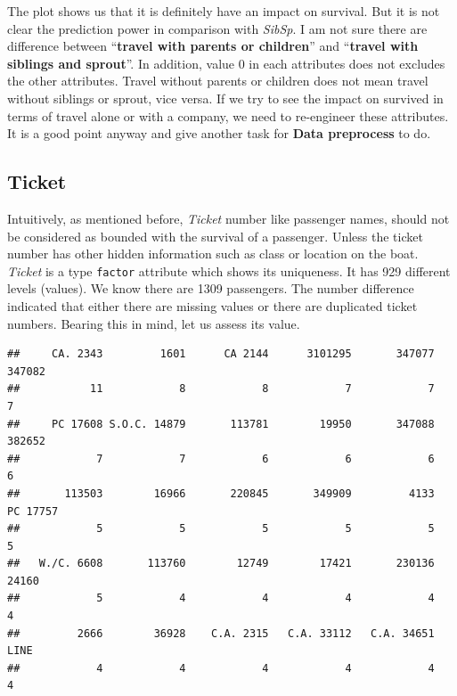\documentclass[
]{book}
\newenvironment{Shaded}{\begin{snugshade}}{\end{snugshade}}
\newcommand{\CommentTok}[1]{\textcolor[rgb]{0.56,0.35,0.01}{\textit{#1}}}
\newcommand{\DecValTok}[1]{\textcolor[rgb]{0.00,0.00,0.81}{#1}}
\newcommand{\KeywordTok}[1]{\textcolor[rgb]{0.13,0.29,0.53}{\textbf{#1}}}
\newcommand{\NormalTok}[1]{#1}
\newcommand{\OperatorTok}[1]{\textcolor[rgb]{0.81,0.36,0.00}{\textbf{#1}}}
\begin{document}
The plot shows us that it is definitely have an impact on survival. But it is not clear the prediction power in comparison with \emph{SibSp}. I am not sure there are difference between ``\textbf{travel with parents or children}'' and ``\textbf{travel with siblings and sprout}''. In addition, value 0 in each attributes does not excludes the other attributes. Travel without parents or children does not mean travel without siblings or sprout, vice versa. If we try to see the impact on survived in terms of travel alone or with a company, we need to re-engineer these attributes. It is a good point anyway and give another task for \textbf{Data preprocess } to do.

\hypertarget{ticket}{%
\subsection*{Ticket}\label{ticket}}


Intuitively, as mentioned before, \emph{Ticket} number like passenger names, should not be considered as bounded with the survival of a passenger. Unless the ticket number has other hidden information such as class or location on the boat. \emph{Ticket} is a type \texttt{factor} attribute which shows its uniqueness. It has 929 different levels (values). We know there are 1309 passengers. The number difference indicated that either there are missing values or there are duplicated ticket numbers. Bearing this in mind, let us assess its value.

\begin{Shaded}
\end{Shaded}

\begin{verbatim}
##     CA. 2343         1601      CA 2144      3101295       347077       347082 
##           11            8            8            7            7            7 
##     PC 17608 S.O.C. 14879       113781        19950       347088       382652 
##            7            7            6            6            6            6 
##       113503        16966       220845       349909         4133     PC 17757 
##            5            5            5            5            5            5 
##   W./C. 6608       113760        12749        17421       230136        24160 
##            5            4            4            4            4            4 
##         2666        36928    C.A. 2315   C.A. 33112   C.A. 34651         LINE 
##            4            4            4            4            4            4
\end{verbatim}
\end{document}
